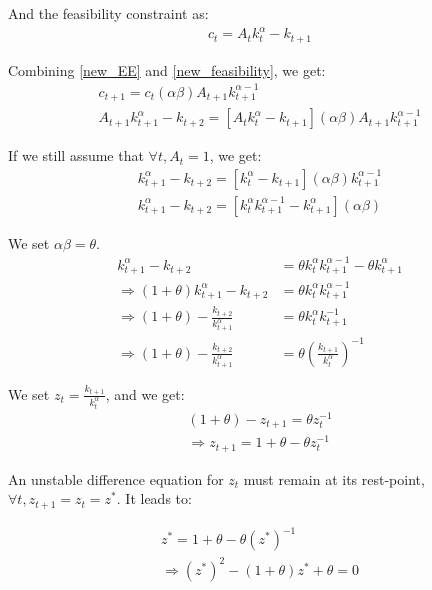 \documentclass[a4paper,12pt]{article}
\begin{document}
And the feasibility constraint as:
\begin{align}
    c_t = A_t k_t^\alpha - k_{t+1} \label{new_feasibility}
\end{align}

Combining \eqref{new_EE} and \eqref{new_feasibility}, we get:
\begin{align}
    {c_{t+1}} = 
     {c_{t}} (\alpha \beta ) A_{t+1} k_{t+1}^{\alpha - 1} \\
    A_{t+1} k_{t+1}^\alpha - k_{t+2} = [A_{t} k_{t}^{\alpha} - k_{t+1}] 
    (\alpha \beta)  A_{t+1} k_{t+1}^{\alpha - 1} 
\end{align}

If we still assume that $\forall t, A_t = 1$, we get:
\begin{align}
    k_{t+1}^\alpha - k_{t+2} = [k_{t}^{\alpha} - k_{t+1}] 
    (\alpha \beta) k_{t+1}^{\alpha - 1} \\
    k_{t+1}^\alpha - k_{t+2} = [k_{t}^{\alpha}k_{t+1}^{\alpha - 1} 
    - k_{t+1}^{\alpha}] 
    (\alpha \beta)
\end{align}

We set $\alpha \beta = \theta$. 
\begin{align}
    k_{t+1}^\alpha - k_{t+2} & = \theta k_{t}^{\alpha}k_{t+1}^{\alpha - 1} 
    - \theta k_{t+1}^{\alpha} \\
    \Rightarrow (1 + \theta) k_{t+1}^\alpha - k_{t+2} & = 
    \theta k_{t}^{\alpha}k_{t+1}^{\alpha - 1} \\
    \Rightarrow (1 + \theta) - \frac{k_{t+2}}{k_{t+1}^\alpha} & = 
    \theta k_{t}^{\alpha}k_{t+1}^{- 1} \\
    \Rightarrow (1 + \theta) - \frac{k_{t+2}}{k_{t+1}^\alpha} & = 
    \theta (\frac{k_{t+1}}{k_{t}^{\alpha}})^{-1}
\end{align}

We set $z_t = \frac{k_{t+1}}{k_{t}^{\alpha}}$, and we get:
\begin{align}
(1 + \theta) - z_{t+1} = 
\theta z_t^{-1} \\ 
\Rightarrow z_{t+1} = 1 + \theta - \theta z_t^{-1}
\end{align}

An unstable difference equation for $z_t$ must remain at its 
rest-point, $\forall t, z_{t+1} = z_t = z^*$. It leads to: 

\begin{align}
    z^* = 1 + \theta - \theta (z^*)^{-1} \\
    \Rightarrow (z^*)^2 - (1 + \theta) z^* + \theta = 0 \label{polynomial}
\end{align}
\end{document}
